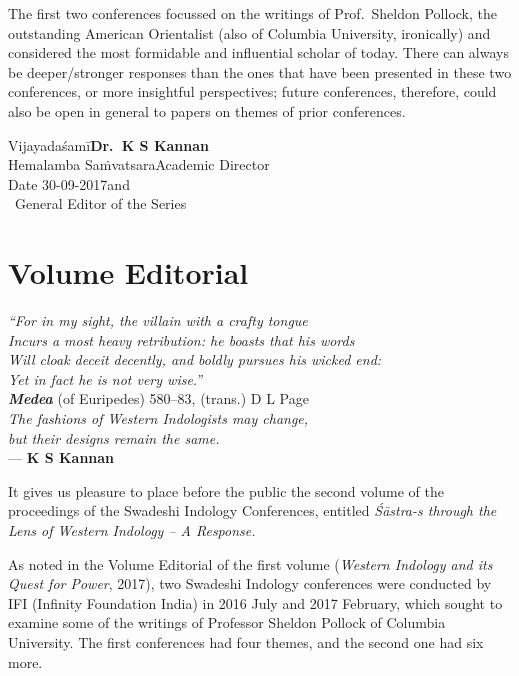 The first two conferences focussed on the writings of Prof.\ Sheldon Pollock, the outstanding American Orientalist (also of Columbia University, ironically) and considered the most formidable and influential scholar of today. There can always be deeper/stronger responses than the ones that have been presented in these two conferences, or more insightful perspectives; future conferences, therefore, could also be open in general to papers on themes of prior conferences.
\bigskip

\noindent
Vijayadaśamī\hfill	{\bf Dr.~K S Kannan}\\
Hemalamba Saṁvatsara\hfill Academic Director\\
Date 30-09-2017\hfill and\\	
\phantom{.}~\hfill General Editor of the Series                  
               

\chapter*{Volume Editorial}\label{editorial}

\vskip 9pt

\begin{flushright}
{{\sl “For in my sight, the villain with a crafty tongue}}\\
{\sl Incurs a most heavy retribution: he boasts that his words}\\
{\sl Will cloak deceit decently, and boldly pursues his wicked end:}\\
{\sl Yet in fact he is not very wise.”}\\
{\sl {\bfseries Medea}} (of Euripedes) 580--83, (trans.) D L Page\\[5pt]
{\sl The fashions of Western Indologists may change,\\ 
but their designs remain the same.}\\[3pt]
--- {\bf K S Kannan}
\end{flushright}

It gives us pleasure to place before the public the second volume of the proceedings of the Swadeshi Indology Conferences, entitled    
{\sl Śāstra-s through the Lens of Western Indology -- A Response.}

As noted in the Volume Editorial of the first volume ({\sl Western Indology and its Quest for Power}, 2017), two Swadeshi Indology conferences were conducted by IFI (Infinity Foundation India) in 2016 July and 2017 February, which sought to examine some of the writings of Professor Sheldon Pollock of Columbia University. The first conferences had four themes, and the second one had six more. 

